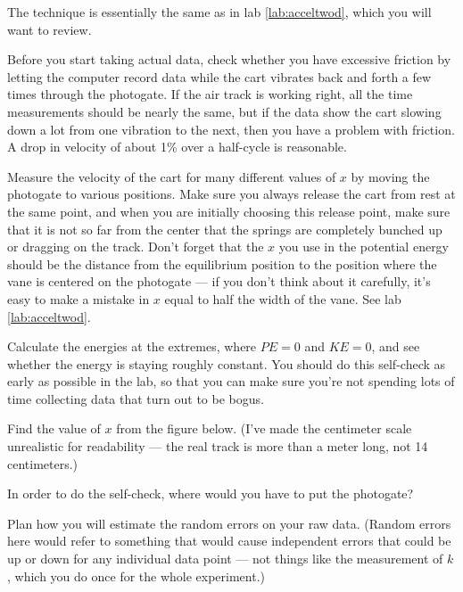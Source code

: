 \observations

The technique is essentially the same as in lab \ref{lab:acceltwod}, which you will want
to review.

Before you start taking actual data, check whether you have
excessive friction by letting the computer record data while
the cart vibrates back and forth a few times through the
photogate. If the air track is working right, all the time
measurements should be nearly the same, but if the data show
the cart slowing down a lot from one vibration to the next,
then you have a problem with friction. A drop in velocity of
about 1\% over a half-cycle is reasonable.

Measure the velocity of the cart for many different values
of $x$ by moving the photogate to various positions. Make
sure you always release the cart from rest at the same
point, and when you are initially choosing this release
point, make sure that it is not so far from the center that
the springs are completely bunched up or dragging on the
track. Don't forget that the $x$ you use in the potential
energy should be the distance from the equilibrium position
to the position where the vane is centered on the photogate
--- if you don't think about it carefully, it's easy to make
a mistake in $x$ equal to half the width of the vane.
See lab \ref{lab:acceltwod}.

\selfcheck

Calculate the energies at the extremes, where $PE=0$ and
$KE=0$, and see whether the energy is staying roughly constant.
You should do this self-check as early as possible in the lab, so that
you can make sure you're not spending lots of time collecting data
that turn out to be bogus.

\prelab

\prelabquestion Find the value of $x$ from the figure below. (I've made the
centimeter scale unrealistic for readability --- the real track is
more than a meter long, not 14 centimeters.)


\prelabquestion In order to do the self-check, where would you have
to put the photogate?

\prelabquestion Plan how you will estimate the random errors on your
raw data. (Random errors here would refer to something that would cause
independent errors that could be up or down for any individual data point ---
not things like the measurement of $k$, which you do once for the whole
experiment.)

